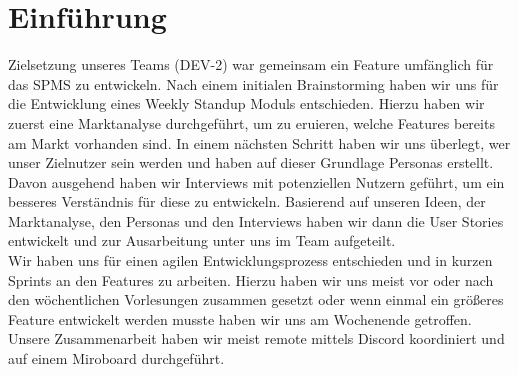 \chapter{Einführung}

Zielsetzung unseres Teams (DEV-2) war gemeinsam ein Feature umfänglich für das \ac{SPMS} zu entwickeln. Nach einem initialen Brainstorming haben wir uns für die Entwicklung eines Weekly Standup Moduls entschieden. Hierzu haben wir zuerst eine Marktanalyse durchgeführt, um zu eruieren, welche Features bereits am Markt vorhanden sind. In einem nächsten Schritt haben wir uns überlegt, wer unser Zielnutzer sein werden und haben auf dieser Grundlage Personas erstellt. Davon ausgehend haben wir Interviews mit potenziellen Nutzern geführt, um ein besseres Verständnis für diese zu entwickeln. Basierend auf unseren Ideen, der Marktanalyse, den Personas und den Interviews haben wir dann die User Stories entwickelt und zur Ausarbeitung unter uns im Team aufgeteilt.\\
Wir haben uns für einen agilen  Entwicklungsprozess entschieden und in kurzen Sprints an den Features zu arbeiten. Hierzu haben wir uns meist vor oder nach den wöchentlichen Vorlesungen zusammen gesetzt oder wenn einmal ein größeres Feature entwickelt werden musste haben wir uns am Wochenende getroffen.\\
Unsere Zusammenarbeit haben wir meist remote mittels Discord\cite{discord2022} koordiniert und auf einem Miroboard\cite{miro2022} durchgeführt. 